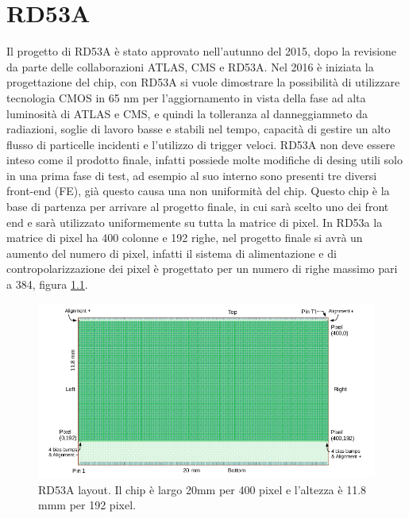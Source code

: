 \chapter{RD53A}

Il progetto di RD53A è stato approvato nell'autunno del 2015, dopo la revisione da parte delle collaborazioni ATLAS, CMS e RD53A. Nel 2016 è iniziata la progettazione del chip, con RD53A si vuole dimostrare la possibilità di utilizzare tecnologia CMOS  in 65 nm per l'aggiornamento in vista della fase ad alta luminosità di ATLAS e CMS, e quindi la tolleranza al danneggiamneto da radiazioni, soglie di lavoro basse e stabili nel tempo, capacità di gestire un alto flusso di particelle incidenti e l'utilizzo di trigger veloci. 
RD53A non deve essere inteso come il prodotto finale, infatti possiede molte modifiche di desing utili solo in una prima fase di test, ad esempio al suo interno sono presenti tre diversi front-end (FE), già questo causa una non uniformità del chip. 
Questo chip è la base di partenza per arrivare al progetto finale, in cui sarà scelto uno dei front end e sarà utilizzato uniformemente su tutta la matrice di pixel. In RD53a la matrice di pixel ha 400 colonne e 192 righe, nel progetto finale si avrà un aumento del numero di pixel, infatti il sistema di alimentazione e di contropolarizzazione dei pixel è progettato per un numero di righe massimo pari a 384, figura \ref{RD53ALayout}.
\begin{figure}
\centering
\includegraphics[scale=.4]{Immagini/RD53ALayout}
\caption{RD53A layout. Il chip è largo 20mm per 400 pixel e l'altezza è 11.8 mmm per 192 pixel.}
\label{RD53ALayout}
\end{figure}

